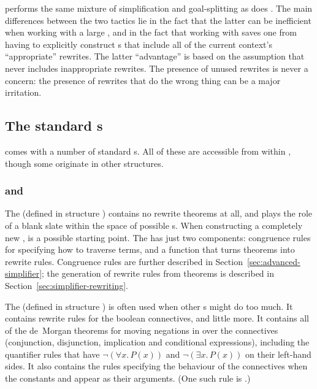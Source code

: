  performs the same mixture of simplification and
goal-splitting as does .  The main differences between the
two tactics lie in the fact that the latter can be inefficient when
working with a large , and in the fact that working with
 saves one from having to explicitly construct
\simpset{}s that include all of the current context's ``appropriate''
rewrites.  The latter ``advantage'' is based on the assumption that
 never includes inappropriate rewrites.  The presence
of unused rewrites is never a concern: the presence of rewrites that
do the wrong thing can be a major irritation.

\subsection{The standard \simpset{}s}
\label{sec:standard-simpsets}

\HOL{} comes with a number of standard \simpset{}s.  All of these are
accessible from within , though some originate in other
structures.

\subsubsection{ and }
%
%
The  \simpset{} (defined in structure )
contains no rewrite theorems at all, and plays the role of a blank
slate within the space of possible \simpset{}s.  When constructing a
completely new \simpset,  is a possible starting point.
The  \simpset{} has just two components: congruence rules
for specifying how to traverse terms, and a function that turns
theorems into rewrite rules.  Congruence rules are further described
in Section~\ref{sec:advanced-simplifier}; the generation of rewrite
rules from theorems is described in
Section~\ref{sec:simplifier-rewriting}.

%
The  \simpset{} (defined in structure ) is
often used when other \simpset{}s might do too much.  It contains
rewrite rules for the boolean connectives, and little more.  It
contains all of the de~Morgan theorems for moving negations in over
the connectives (conjunction, disjunction, implication and conditional
expressions), including the quantifier rules that have $\neg(\forall
x.\,P(x))$ and $\neg(\exists x.\,P (x))$ on their left-hand sides.  It
also contains the rules specifying the behaviour of the connectives
when the constants  and  appear as their
arguments.  (One such rule is .)

